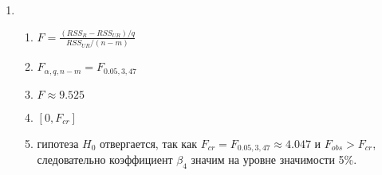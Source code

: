 \begin{problem}
\begin{sol}
\begin{enumerate}
\item
\begin{enumerate}
\item $F =\frac{(RSS_R-RSS_{UR})/q}{RSS_{UR}/(n-m)}$
\item $F_{\alpha,q,n-m}=F_{0.05,3,47}$
\item $F\approx 9.525$
\item $[0,F_{cr}]$
\item гипотеза $H_0$ отвергается, так как $F_{cr}=F_{0.05,3,47} \approx 4.047$ и $F_{obs}>F_{cr}$, следовательно коэффициент $\beta_4$ значим на уровне значимости 5\%.
\end{enumerate}
\end{enumerate}
\end{sol}
\end{problem}




